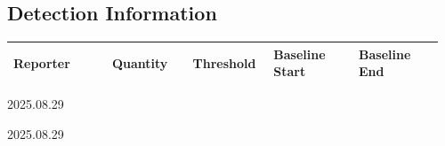 \documentclass[UTF8,10pt,a4paper,fontset=fandol]{ctexart}
\newcommand{\handwritten}[1]{#1}
\begin{document}
\subsection{Detection Information}

\begin{tabular}{|p{0.22\linewidth}|p{0.18\linewidth}|p{0.18\linewidth}|p{0.19\linewidth}|p{0.19\linewidth}|}
\hline
\textbf{Reporter} & \textbf{Quantity} & \textbf{Threshold} &
\textbf{Baseline Start} & \textbf{Baseline End} \\
\hline
\end{tabular}

\medskip

\handwritten{}

\hfill
\handwritten{2025.08.29}

\medskip

\handwritten{}

\hfill
\handwritten{2025.08.29}


\newpage
\end{document}
